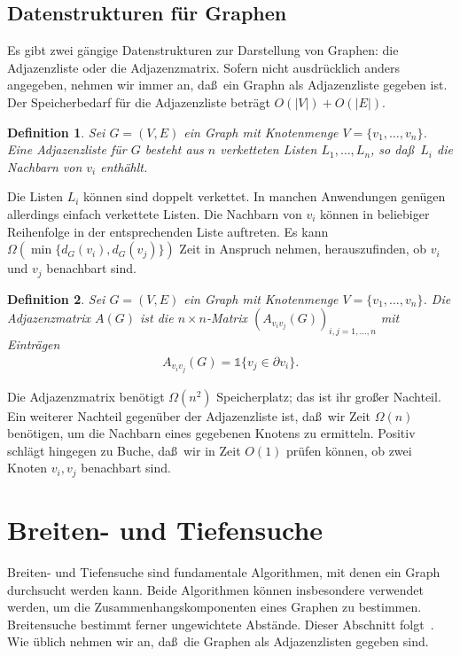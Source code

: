 \documentclass[10pt,reqno]{amsart}
\numberwithin{equation}{section}
\newtheorem{definition}{Definition}[section]
\newcommand{\vecone}{\mathbb{1}}
\begin{document}
\subsection{Datenstrukturen f\"ur Graphen}\label{sec_adj}
Es gibt zwei g\"angige Datenstrukturen zur Darstellung von Graphen: die Adjazenzliste oder die Adjazenzmatrix.
Sofern nicht ausdr\"ucklich anders angegeben, nehmen wir immer an, da\ss\ ein Graphn als Adjazenzliste gegeben ist.
Der Speicherbedarf f\"ur die Adjazenzliste betr\"agt $O(|V|)+O(|E|)$.

\begin{definition}\label{def_adj}
	Sei $G=(V,E)$ ein Graph mit Knotenmenge $V=\{v_1,\ldots,v_n\}$.
	Eine {\em Adjazenzliste} f\"ur $G$ besteht aus $n$ verketteten Listen $L_1,\ldots,L_n$, so da\ss\ $L_i$ die Nachbarn von $v_i$ enth\"ahlt.
\end{definition}

Die Listen $L_i$ k\"onnen sind doppelt verkettet.
In manchen Anwendungen gen\"ugen allerdings einfach verkettete Listen.
Die Nachbarn von $v_i$ k\"onnen in beliebiger Reihenfolge in der entsprechenden Liste auftreten.
Es kann $\Omega(\min\{d_G(v_i),d_G(v_j)\})$ Zeit in Anspruch nehmen, herauszufinden, ob $v_i$ und $v_j$ benachbart sind.

\begin{definition}\label{def_adjm}
	Sei $G=(V,E)$ ein Graph mit Knotenmenge $V=\{v_1,\ldots,v_n\}$.
	Die {\em Adjazenzmatrix} $A(G)$ ist die $n\times n$-Matrix $(A_{v_iv_j}(G))_{i,j=1,\ldots,n}$ mit Eintr\"agen
	\begin{align*}
		A_{v_iv_j}(G)=\vecone\{v_j\in\partial v_i\}.
	\end{align*}
\end{definition}

Die Adjazenzmatrix ben\"otigt $\Omega(n^2)$ Speicherplatz; das ist ihr gro\ss er Nachteil.
Ein weiterer Nachteil gegen\"uber der Adjazenzliste ist, da\ss\ wir Zeit $\Omega(n)$ ben\"otigen, um die Nachbarn eines gegebenen Knotens zu ermitteln.
Positiv schl\"agt hingegen zu Buche, da\ss\ wir in Zeit $O(1)$ pr\"ufen k\"onnen, ob zwei Knoten $v_i,v_j$ benachbart sind.

\section{Breiten- und Tiefensuche}\label{sec_connected}

\noindent
Breiten- und Tiefensuche sind fundamentale Algorithmen, mit denen ein Graph durchsucht werden kann.
Beide Algorithmen k\"onnen insbesondere verwendet werden, um die Zusammenhangskomponenten eines Graphen zu bestimmen.
Breitensuche bestimmt ferner ungewichtete Abst\"ande.
Dieser Abschnitt folgt~\cite{Cormen}.
Wie \"ublich nehmen wir an, da\ss\ die Graphen als Adjazenzlisten gegeben sind.
\end{document}
